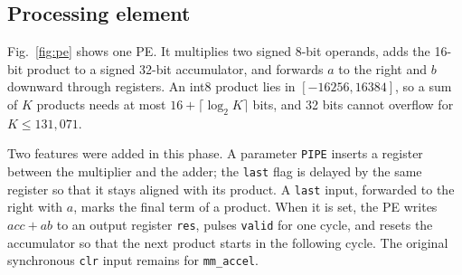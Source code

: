 \documentclass[conference]{IEEEtran}
\newcommand{\code}[1]{\texttt{#1}}
\begin{document}
\subsection{Processing element}
Fig.~\ref{fig:pe} shows one PE. It multiplies two signed 8-bit operands, adds the 16-bit product to a signed 32-bit accumulator, and forwards $a$ to the right and $b$ downward through registers. An int8 product lies in $[-16256, 16384]$, so a sum of $K$ products needs at most $16 + \lceil\log_2 K\rceil$ bits, and 32 bits cannot overflow for $K \le 131{,}071$.

Two features were added in this phase. A parameter \code{PIPE} inserts a register between the multiplier and the adder; the \code{last} flag is delayed by the same register so that it stays aligned with its product. A \code{last} input, forwarded to the right with $a$, marks the final term of a product. When it is set, the PE writes $\mathit{acc} + ab$ to an output register \code{res}, pulses \code{valid} for one cycle, and resets the accumulator so that the next product starts in the following cycle. The original synchronous \code{clr} input remains for \code{mm\_accel}.
\end{document}
